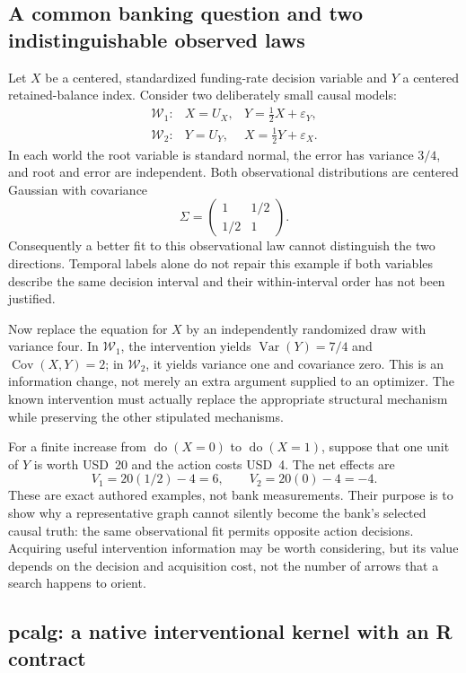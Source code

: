 \subsection{A common banking question and two indistinguishable observed laws}

Let $X$ be a centered, standardized funding-rate decision variable and $Y$ a
centered retained-balance index. Consider two deliberately small causal models:
\[
 \begin{array}{lll}
 \mathcal W_1:&X=U_X,&Y=\tfrac12X+\varepsilon_Y,\\
 \mathcal W_2:&Y=U_Y,&X=\tfrac12Y+\varepsilon_X.
 \end{array}
\]
In each world the root variable is standard normal, the error has variance
$3/4$, and root and error are independent. Both observational distributions
are centered Gaussian with covariance
\[
 \Sigma=\begin{pmatrix}1&1/2\\1/2&1\end{pmatrix}.
\]
Consequently a better fit to this observational law cannot distinguish the
two directions. Temporal labels alone do not repair this example if both
variables describe the same decision interval and their within-interval order
has not been justified.

Now replace the equation for $X$ by an independently randomized draw with
variance four. In $\mathcal W_1$, the intervention yields
$\operatorname{Var}(Y)=7/4$ and $\operatorname{Cov}(X,Y)=2$; in
$\mathcal W_2$, it yields variance one and covariance zero. This is an
information change, not merely an extra argument supplied to an optimizer.
The known intervention must actually replace the appropriate structural
mechanism while preserving the other stipulated mechanisms.

For a finite increase from $\operatorname{do}(X=0)$ to
$\operatorname{do}(X=1)$, suppose that one unit of $Y$ is worth USD~20 and
the action costs USD~4. The net effects are
\[
 V_1=20(1/2)-4=6,\qquad V_2=20(0)-4=-4.
\]
These are exact authored examples, not bank measurements. Their purpose is to
show why a representative graph cannot silently become the bank's selected
causal truth: the same observational fit permits opposite action decisions.
Acquiring useful intervention information may be worth considering, but its
value depends on the decision and acquisition cost, not the number of arrows
that a search happens to orient. \citep{exec16_ct_oracle}

\subsection{pcalg: a native interventional kernel with an R contract}

